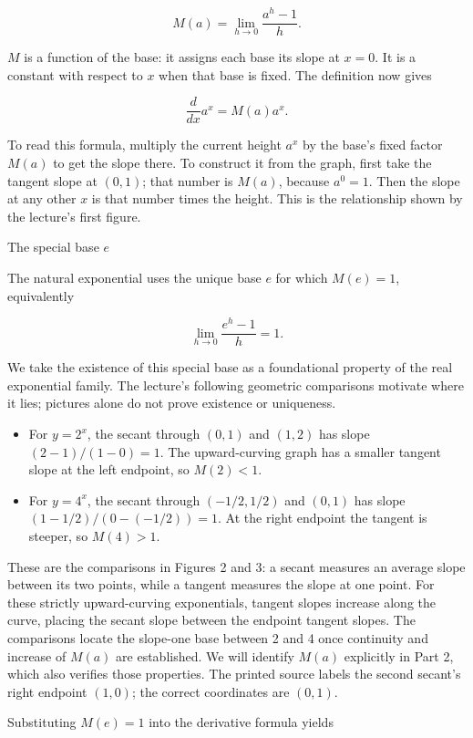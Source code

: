 \documentclass[
  11pt,
]{article}
\providecommand{\tightlist}{%
  \setlength{\itemsep}{0pt}\setlength{\parskip}{0pt}}
\begin{document}
\[
M(a)=\lim_{h\to0}\frac{a^h-1}{h}.
\]

\(M\) is a function of the base: it assigns each base its slope at
\(x=0\). It is a constant with respect to \(x\) when that base is fixed.
The definition now gives

\[
\frac{d}{dx}a^x=M(a)a^x.
\]

To read this formula, multiply the current height \(a^x\) by the base's
fixed factor \(M(a)\) to get the slope there. To construct it from the
graph, first take the tangent slope at \((0,1)\); that number is
\(M(a)\), because \(a^0=1\). Then the slope at any other \(x\) is that
number times the height. This is the relationship shown by the lecture's
first figure.

The special base \(e\)

The natural exponential uses the unique base \(e\) for which \(M(e)=1\),
equivalently

\[
\lim_{h\to0}\frac{e^h-1}{h}=1.
\]

We take the existence of this special base as a foundational property of
the real exponential family. The lecture's following geometric
comparisons motivate where it lies; pictures alone do not prove
existence or uniqueness.

\begin{itemize}
\tightlist
\item
  For \(y=2^x\), the secant through \((0,1)\) and \((1,2)\) has slope
  \((2-1)/(1-0)=1\). The upward-curving graph has a smaller tangent
  slope at the left endpoint, so \(M(2)<1\).
\item
  For \(y=4^x\), the secant through \((-1/2,1/2)\) and \((0,1)\) has
  slope \((1-1/2)/(0-(-1/2))=1\). At the right endpoint the tangent is
  steeper, so \(M(4)>1\).
\end{itemize}

These are the comparisons in Figures 2 and 3: a secant measures an
average slope between its two points, while a tangent measures the slope
at one point. For these strictly upward-curving exponentials, tangent
slopes increase along the curve, placing the secant slope between the
endpoint tangent slopes. The comparisons locate the slope-one base
between 2 and 4 once continuity and increase of \(M(a)\) are
established. We will identify \(M(a)\) explicitly in Part 2, which also
verifies those properties. The printed source labels the second secant's
right endpoint \((1,0)\); the correct coordinates are \((0,1)\).

Substituting \(M(e)=1\) into the derivative formula yields
\end{document}
